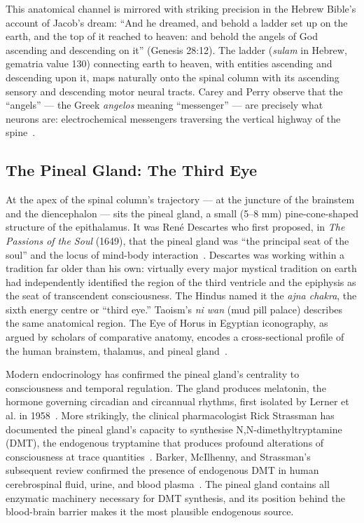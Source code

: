 \documentclass[12pt, a4paper]{article}
\begin{document}
This anatomical channel is mirrored with striking precision in the Hebrew
Bible's account of Jacob's dream: ``And he dreamed, and behold a ladder set up
on the earth, and the top of it reached to heaven: and behold the angels of
God ascending and descending on it'' (Genesis 28:12). The ladder (\emph{sulam}
in Hebrew, gematria value 130) connecting earth to heaven, with entities
ascending and descending upon it, maps naturally onto the spinal column
with its ascending sensory and descending motor neural tracts. Carey and
Perry observe that the ``angels'' — the Greek \emph{angelos} meaning
``messenger'' — are precisely what neurons are: electrochemical messengers
traversing the vertical highway of the spine~\autocite[44]{carey1932}.

\subsection{The Pineal Gland: The Third Eye}

At the apex of the spinal column's trajectory — at the juncture of the
brainstem and the diencephalon — sits the pineal gland, a small (5--8 mm)
pine-cone-shaped structure of the epithalamus. It was René Descartes who
first proposed, in \emph{The Passions of the Soul} (1649), that the pineal
gland was ``the principal seat of the soul'' and the locus of
mind-body interaction~\autocite{descartes1649}. Descartes was working
within a tradition far older than his own: virtually every major mystical
tradition on earth had independently identified the region of the third
ventricle and the epiphysis as the seat of transcendent consciousness. The
Hindus named it the \emph{ajna chakra}, the sixth energy centre or ``third
eye.'' Taoism's \emph{ni wan} (mud pill palace) describes the same anatomical
region. The Eye of Horus in Egyptian iconography, as argued by scholars of
comparative anatomy, encodes a cross-sectional profile of the human
brainstem, thalamus, and pineal
gland~\autocite[198]{schwaller1998}\autocite[312]{hall1928}.

Modern endocrinology has confirmed the pineal gland's centrality to
consciousness and temporal regulation. The gland produces melatonin, the
hormone governing circadian and circannual rhythms, first isolated by Lerner
et al. in 1958~\autocite{lerner1958}. More strikingly, the clinical pharmacologist
Rick Strassman has documented the pineal gland's capacity to synthesise
N,N-dimethyltryptamine (DMT), the endogenous tryptamine that produces
profound alterations of consciousness at trace quantities~\autocite{strassman2001}.
Barker, McIlhenny, and Strassman's subsequent review confirmed the presence
of endogenous DMT in human cerebrospinal fluid, urine, and blood
plasma~\autocite{barker2013}. The pineal gland contains all enzymatic
machinery necessary for DMT synthesis, and its position behind the
blood-brain barrier makes it the most plausible endogenous source.
\end{document}
